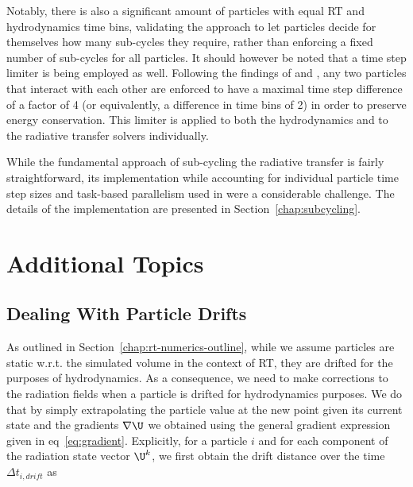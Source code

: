 Notably, there is also a significant amount of particles with equal RT and hydrodynamics time bins,
validating the approach to let particles decide for themselves how many sub-cycles they require,
rather than enforcing a fixed number of sub-cycles for all particles. It should however be noted
that a time step limiter is being employed as well. Following the findings of
\citet{saitohNecessaryConditionIndividual2009} and \citet{durierImplementationFeedbackSmoothed2012},
any two particles that interact with each other are enforced to have a maximal time step difference
of a factor of 4 (or equivalently, a difference in time bins of 2) in order to preserve energy
conservation. This limiter is applied to both the hydrodynamics and to the radiative transfer
solvers individually.

While the fundamental approach of sub-cycling the radiative transfer is fairly straightforward, its
implementation while accounting for individual particle time step sizes and task-based parallelism
used in \swift were a considerable challenge. The details of the implementation are presented in
Section~\ref{chap:subcycling}.











\section{Additional Topics}


\subsection{Dealing With Particle Drifts}\label{chap:rt-drift}

As outlined in Section~\ref{chap:rt-numerics-outline}, while we assume particles are static w.r.t.
the simulated volume in the context of RT, they are drifted for the purposes of hydrodynamics. As a
consequence, we need to make corrections to the radiation fields when a particle is drifted for
hydrodynamics purposes. We do that by simply extrapolating the particle value at the new point given
its current state and the gradients $\nabla \U$ we obtained using the general gradient expression
given in eq~\ref{eq:gradient}. Explicitly, for a particle $i$ and for each component of the
radiation state vector $\U^k$, we first obtain the drift distance over the time $\Delta t_{i,
drift}$ as

